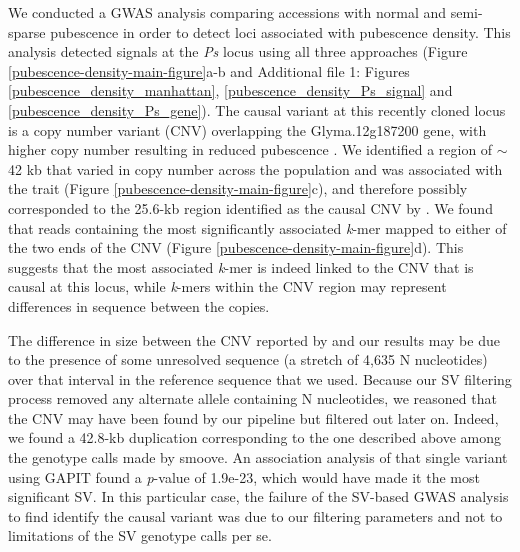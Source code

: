 We conducted a GWAS analysis comparing accessions with normal and semi-sparse
pubes\-cence in order to detect loci associated with pubescence density. This analysis
detected signals at the \textit{Ps} locus using all three approaches (Figure
\ref{pubescence-density-main-figure}a-b and Additional file 1: Figures \ref{pubescence_density_manhattan}, \ref{pubescence_density_Ps_signal}
and \ref{pubescence_density_Ps_gene}). The causal
variant at this recently cloned locus is a copy number variant (CNV) overlapping the
Glyma.12g187200 gene, with higher copy number resulting in reduced pubescence \citep{liu2020ps}.
We identified a region of $\sim$42 kb that varied in copy number across
the population and was associated with the trait (Figure
\ref{pubescence-density-main-figure}c), and therefore possibly corresponded to the
25.6-kb region identified as the causal CNV by \cite{liu2020ps}. We found that
reads containing the most significantly associated \textit{k}-mer mapped to either of the two ends
of the CNV (Figure \ref{pubescence-density-main-figure}d). This suggests that
the most associated \textit{k}-mer is indeed linked to the CNV
that is causal at this locus, while \textit{k}-mers within the
CNV region may represent differences in sequence between the copies.

The difference in size between the CNV reported by \cite{liu2020ps} and our
results may be due to the presence of some unresolved sequence (a stretch of
4,635 N nucleotides) over that interval in the reference sequence that we used.
Because our SV filtering process removed any alternate allele containing N nucleotides,
we reasoned that the CNV may have been found by our pipeline but
filtered out later on. Indeed, we found a 42.8-kb duplication corresponding
to the one described above among the genotype calls made by smoove. An association
analysis of that single variant using GAPIT found a \textit{p}-value of 1.9e-23,
which would have made it the most significant SV. In this particular case, the
failure of the SV-based GWAS analysis to find identify the causal variant was due
to our filtering parameters and not to limitations of the SV genotype calls per se.

